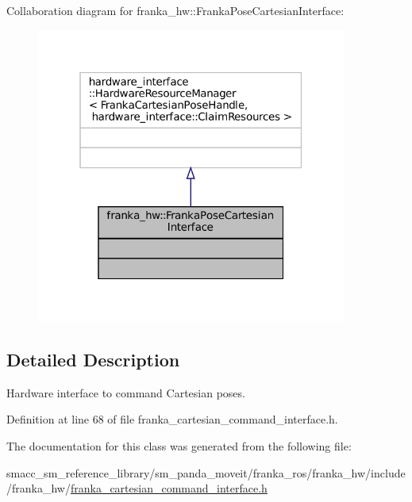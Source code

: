 Collaboration diagram for franka\+\_\+hw\+:\+:Franka\+Pose\+Cartesian\+Interface\+:
\nopagebreak
\begin{figure}[H]
\begin{center}
\leavevmode
\includegraphics[width=289pt]{classfranka__hw_1_1FrankaPoseCartesianInterface__coll__graph}
\end{center}
\end{figure}


\subsection{Detailed Description}
Hardware interface to command Cartesian poses. 

Definition at line 68 of file franka\+\_\+cartesian\+\_\+command\+\_\+interface.\+h.



The documentation for this class was generated from the following file\+:\begin{DoxyCompactItemize}
\item 
smacc\+\_\+sm\+\_\+reference\+\_\+library/sm\+\_\+panda\+\_\+moveit/franka\+\_\+ros/franka\+\_\+hw/include/franka\+\_\+hw/\hyperlink{franka__cartesian__command__interface_8h}{franka\+\_\+cartesian\+\_\+command\+\_\+interface.\+h}\end{DoxyCompactItemize}

